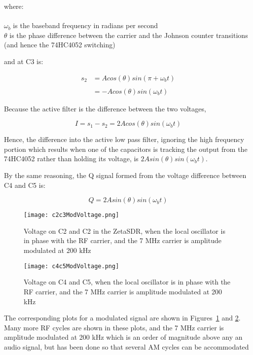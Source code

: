 \documentclass[11pt, twoside]{article}
\begin{document}
where:\\
\\
  ${\omega_b}$ is the baseband frequency in radians per second\\
$\theta$ is the phase difference between the carrier and the Johnson counter transitions (and hence the 74HC4052 switching)

and at C3 is:

\begin{align*}
  s_2 & = A cos(\theta) sin(\pi + {\omega_b}t) \\
  \\
  &= -A cos(\theta) sin({\omega_b}t)
\end{align*}

Because the active filter is the difference between the two voltages,

\begin{equation}\label{eqn:tayloei}
  I = s_1 - s_2 = 2 A cos(\theta) sin({\omega_b}t)
\end{equation}

Hence, the difference into the active low pass filter, ignoring the
high frequency portion which results when one of the capacitors is
tracking the output from the 74HC4052 rather than holding its voltage,
is $2A sin(\theta) sin({\omega_b}t)$.

By the same reasoning, the Q signal formed from the voltage difference
between C4 and C5 is:

\begin{equation}\label{eqn:tayloeq}
  Q = 2 A sin(\theta) sin({\omega_b}t)
\end{equation}

\begin{figure}
  \center
  \captionsetup{width=.8\linewidth}
  \texttt{[image: c2c3ModVoltage.png]}
  \caption{Voltage on C2 and C2 in the ZetaSDR, when the local
    oscillator is in phase with the RF carrier, and the 7 MHz carrier
    is amplitude modulated at 200 kHz}
  \label{figure:C2C3mod}
\end{figure}

\begin{figure}
  \center
  \captionsetup{width=.8\linewidth}
  \texttt{[image: c4c5ModVoltage.png]}
  \caption{Voltage on C4 and C5, when the local oscillator is in phase
    with the RF carrier, and the 7 MHz carrier is amplitude modulated
    at 200 kHz}
  \label{figure:C4C5mod}
\end{figure}


The corresponding plots for a modulated signal are shown in
Figures~\ref{figure:C2C3mod} and \ref{figure:C4C5mod}. Many more RF
cycles are shown in these plots, and the 7 MHz carrier is amplitude
modulated at 200 kHz which is an order of magnitude above any an audio
signal, but has been done so that several AM cycles can be accommodated
\end{document}
